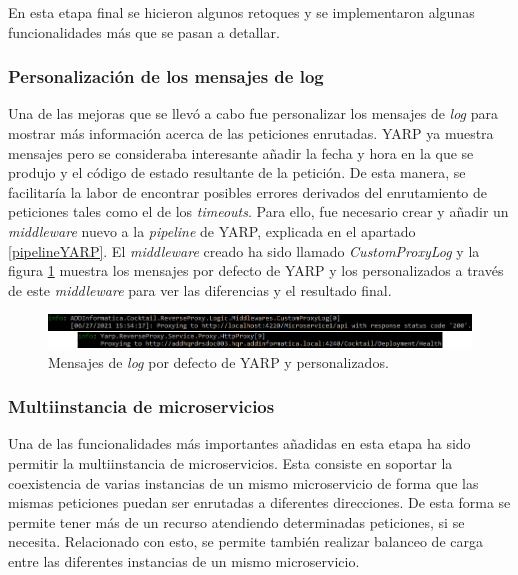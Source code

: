\documentclass[11pt,spanish,listoffigures]{tfgetsinf}
\begin{document}
En esta etapa final se hicieron algunos retoques y se implementaron algunas funcionalidades más que se pasan a detallar.


			\subsubsection{Personalización de los mensajes de log}

Una de las mejoras que se llevó a cabo fue personalizar los mensajes de \emph{log} para mostrar más información acerca de las peticiones enrutadas. YARP ya muestra mensajes pero se consideraba interesante añadir la fecha y hora en la que se produjo y el código de estado resultante de la petición. De esta manera, se facilitaría la labor de encontrar posibles errores derivados del enrutamiento de peticiones tales como el de los \emph{timeouts}. Para ello, fue necesario crear y añadir un \emph{middleware} nuevo a la \emph{pipeline} de YARP, explicada en el apartado \ref{pipelineYARP}. El \emph{middleware} creado ha sido llamado \emph{CustomProxyLog} y la figura \ref{logs} muestra los mensajes por defecto de YARP y los personalizados a través de este \emph{middleware} para ver las diferencias y el resultado final.

\begin{figure}[ht]
\centering
\includegraphics[width=1\textwidth]{imagenes/logs}
\caption{Mensajes de \emph{log} por defecto de YARP y personalizados.}
	\label{logs}
\end{figure}


			\subsubsection{Multiinstancia de microservicios}

Una de las funcionalidades más importantes añadidas en esta etapa ha sido permitir la multiinstancia de microservicios. Esta consiste en soportar la coexistencia de varias instancias de un mismo microservicio de forma que las mismas peticiones puedan ser enrutadas a diferentes direcciones. De esta forma se permite tener más de un recurso atendiendo determinadas peticiones, si se necesita. Relacionado con esto, se permite también realizar balanceo de carga entre las diferentes instancias de un mismo microservicio.
\end{document}
